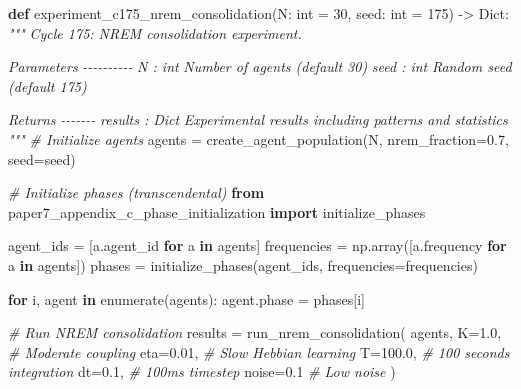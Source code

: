 \documentclass[
]{article}
\newenvironment{Shaded}{}{}
\newcommand{\BuiltInTok}[1]{\textcolor[rgb]{0.00,0.50,0.00}{#1}}
\newcommand{\CommentTok}[1]{\textcolor[rgb]{0.38,0.63,0.69}{\textit{#1}}}
\newcommand{\ControlFlowTok}[1]{\textcolor[rgb]{0.00,0.44,0.13}{\textbf{#1}}}
\newcommand{\DecValTok}[1]{\textcolor[rgb]{0.25,0.63,0.44}{#1}}
\newcommand{\FloatTok}[1]{\textcolor[rgb]{0.25,0.63,0.44}{#1}}
\newcommand{\ImportTok}[1]{\textcolor[rgb]{0.00,0.50,0.00}{\textbf{#1}}}
\newcommand{\KeywordTok}[1]{\textcolor[rgb]{0.00,0.44,0.13}{\textbf{#1}}}
\newcommand{\NormalTok}[1]{#1}
\newcommand{\OperatorTok}[1]{\textcolor[rgb]{0.40,0.40,0.40}{#1}}
\begin{document}
\begin{Shaded}
\begin{Highlighting}[]
\KeywordTok{def}\NormalTok{ experiment\_c175\_nrem\_consolidation(N: }\BuiltInTok{int} \OperatorTok{=} \DecValTok{30}\NormalTok{,}
\NormalTok{                                      seed: }\BuiltInTok{int} \OperatorTok{=} \DecValTok{175}\NormalTok{) }\OperatorTok{{-}\textgreater{}}\NormalTok{ Dict:}
    \CommentTok{"""}
\CommentTok{    Cycle 175: NREM consolidation experiment.}

\CommentTok{    Parameters}
\CommentTok{    {-}{-}{-}{-}{-}{-}{-}{-}{-}{-}}
\CommentTok{    N : int}
\CommentTok{        Number of agents (default 30)}
\CommentTok{    seed : int}
\CommentTok{        Random seed (default 175)}

\CommentTok{    Returns}
\CommentTok{    {-}{-}{-}{-}{-}{-}{-}}
\CommentTok{    results : Dict}
\CommentTok{        Experimental results including patterns and statistics}
\CommentTok{    """}
    \CommentTok{\# Initialize agents}
\NormalTok{    agents }\OperatorTok{=}\NormalTok{ create\_agent\_population(N, nrem\_fraction}\OperatorTok{=}\FloatTok{0.7}\NormalTok{, seed}\OperatorTok{=}\NormalTok{seed)}

    \CommentTok{\# Initialize phases (transcendental)}
    \ImportTok{from}\NormalTok{ paper7\_appendix\_c\_phase\_initialization }\ImportTok{import}\NormalTok{ initialize\_phases}

\NormalTok{    agent\_ids }\OperatorTok{=}\NormalTok{ [a.agent\_id }\ControlFlowTok{for}\NormalTok{ a }\KeywordTok{in}\NormalTok{ agents]}
\NormalTok{    frequencies }\OperatorTok{=}\NormalTok{ np.array([a.frequency }\ControlFlowTok{for}\NormalTok{ a }\KeywordTok{in}\NormalTok{ agents])}
\NormalTok{    phases }\OperatorTok{=}\NormalTok{ initialize\_phases(agent\_ids, frequencies}\OperatorTok{=}\NormalTok{frequencies)}

    \ControlFlowTok{for}\NormalTok{ i, agent }\KeywordTok{in} \BuiltInTok{enumerate}\NormalTok{(agents):}
\NormalTok{        agent.phase }\OperatorTok{=}\NormalTok{ phases[i]}

    \CommentTok{\# Run NREM consolidation}
\NormalTok{    results }\OperatorTok{=}\NormalTok{ run\_nrem\_consolidation(}
\NormalTok{        agents,}
\NormalTok{        K}\OperatorTok{=}\FloatTok{1.0}\NormalTok{,       }\CommentTok{\# Moderate coupling}
\NormalTok{        eta}\OperatorTok{=}\FloatTok{0.01}\NormalTok{,    }\CommentTok{\# Slow Hebbian learning}
\NormalTok{        T}\OperatorTok{=}\FloatTok{100.0}\NormalTok{,     }\CommentTok{\# 100 seconds integration}
\NormalTok{        dt}\OperatorTok{=}\FloatTok{0.1}\NormalTok{,      }\CommentTok{\# 100ms timestep}
\NormalTok{        noise}\OperatorTok{=}\FloatTok{0.1}    \CommentTok{\# Low noise}
\NormalTok{    )}


\end{Highlighting}
\end{Shaded}
\end{document}
